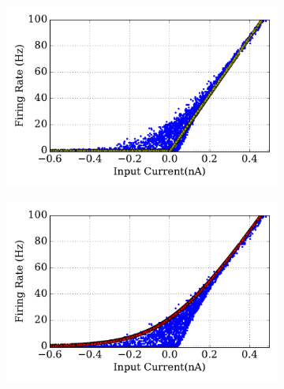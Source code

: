 	\DIFaddend \begin{figure}[tbh!]
		\centering
		\begin{subfigure}[t]{0.48\textwidth}
			\DIFdelbeginFL %
\DIFdelendFL \DIFaddbeginFL \includegraphics[width=\textwidth]{pics_iconip/revise_6-5-1.pdf}
		\DIFaddendFL \end{subfigure}
		\begin{subfigure}[t]{0.48\textwidth}
			\DIFdelbeginFL %
\DIFdelendFL \DIFaddbeginFL \includegraphics[width=\textwidth]{pics_iconip/revise_6-5-2.pdf}
		\DIFaddendFL \end{subfigure}\\
		\begin{subfigure}[t]{0.6\textwidth}
			\DIFdelbeginFL %

\end{subfigure}
\end{figure}

